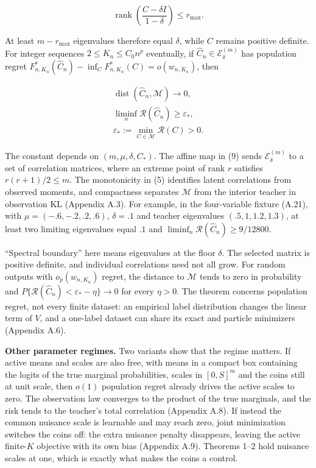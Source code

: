 \documentclass{article}
\begin{document}
\[
\operatorname{rank}\left(\frac{C-\delta I}{1-\delta}\right)\le r_{\max}.
\tag{9}
\]

At least \(m-r_{\max}\) eigenvalues therefore equal \(\delta\), while
\(C\) remains positive definite. For integer sequences
\(2\le K_n\le C_0n^p\) eventually, if
\(\widehat C_n\in\mathcal E_\delta^{(m)}\) has population regret
\(F_{n,K_n}^*(\widehat C_n)-\inf_C F_{n,K_n}^*(C)=o(w_{n,K_n})\), then

\[
\begin{gathered}
\operatorname{dist}(\widehat C_n,\mathcal M)\to0,\\
\liminf_n\mathcal R(\widehat C_n)
\ge\varepsilon_*,\\
\varepsilon_*:=\min_{C\in\mathcal M}\mathcal R(C)>0.
\end{gathered}
\tag{10}
\]

The constant depends on \((m,\mu,\delta,C_*)\). The affine map in (9)
sends \(\mathcal E_\delta^{(m)}\) to a set of correlation matrices,
where an extreme point of rank \(r\) satisfies \(r(r+1)/2\le m\). The
monotonicity in (5) identifies latent correlations from observed
moments, and compactness separates \(\mathcal M\) from the interior
teacher in observation KL (Appendix A.3). For example, in the
four-variable fixture (A.21), with \(\mu=(-.6,-.2,.2,.6)\),
\(\delta=.1\) and teacher eigenvalues \((.5,1,1.2,1.3)\), at least two
limiting eigenvalues equal \(.1\) and
\(\liminf_n\mathcal R(\widehat C_n)\ge9/12800\).

``Spectral boundary'' here means eigenvalues at the floor \(\delta\).
The selected matrix is positive definite, and individual correlations
need not all grow. For random outputs with \(o_p(w_{n,K_n})\) regret,
the distance to \(\mathcal M\) tends to zero in probability and
\(P\{\mathcal R(\widehat C_n)<\varepsilon_*-\eta\}\to0\) for every
\(\eta>0\). The theorem concerns population regret, not every finite
dataset: an empirical label distribution changes the linear term of
\(V\), and a one-label dataset can share its exact and particle
minimizers (Appendix A.6).

\textbf{Other parameter regimes.} Two variants show that the regime
matters. If active means and scales are also free, with means in a
compact box containing the logits of the true marginal probabilities,
scales in \([0,S]^m\) and the coins still at unit scale, then \(o(1)\)
population regret already drives the active scales to zero. The
observation law converges to the product of the true marginals, and the
risk tends to the teacher's total correlation (Appendix A.8). If instead
the common nuisance scale is learnable and may reach zero, joint
minimization switches the coins off: the extra nuisance penalty
disappears, leaving the active finite-\(K\) objective with its own bias
(Appendix A.9). Theorems 1--2 hold nuisance scales at one, which is
exactly what makes the coins a control.
\end{document}
